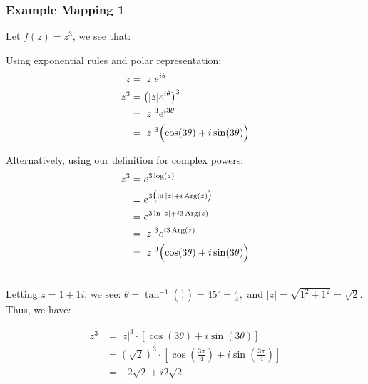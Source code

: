 \documentclass[a4paper, 10pt ]{article} %
\theoremstyle{definition}
\theoremstyle{plain}
\begin{document}
\subsubsection{Example Mapping 1}
Let \( f(z) = z^3 \), we see that: \\
\begin{minipage}{0.47\textwidth}
  Using exponential rules and polar representation:
  \begin{align*}
    z   & = |z|e^{i\theta}                                   \\
    z^3 & = \bigl(|z|e^{i\theta}\bigr)^3                     \\
        & = |z|^3 e^{i3\theta}                               \\
        & = |z|^3 \Bigl(\cos(3\theta) + i\sin(3\theta)\Bigr)
  \end{align*}
\end{minipage}\hfill
\begin{minipage}{0.47\textwidth}
  Alternatively, using our definition for complex powers:
  \begin{align*}
    z^3 & = e^{3\log(z)}                                     \\
        & = e^{3\bigl(\ln|z| + i\,\mathrm{Arg}(z)\bigr)}     \\
        & = e^{3\ln|z| + i3\,\mathrm{Arg}(z)}                \\
        & = |z|^3 e^{i3\,\mathrm{Arg}(z)}                    \\
        & = |z|^3 \Bigl(\cos(3\theta) + i\sin(3\theta)\Bigr)
  \end{align*}
\end{minipage}\hfill\\[1ex]
Letting $z = 1 + 1i$, we see:
$\theta = \tan^{-1}\left(\frac{1}{1}\right) = 45^\circ = \frac{\pi}{4},$
and $|z| = \sqrt{1^2 + 1^2} = \sqrt{2}$.  Thus, we have: \\
\begin{minipage}{0.47\textwidth}
  \begin{align*}
    z^3 & = |z|^3\cdot \left[\cos(3\theta) + i\sin(3\theta)\right]                                            \\
        & = (\sqrt{2})^3\cdot \left[\cos\left(\frac{3\pi}{4}\right) + i\sin\left(\frac{3\pi}{4}\right)\right] \\
        & = -2\sqrt{2} + i 2\sqrt{2}
  \end{align*}
\end{minipage}\hfill
\end{document}
